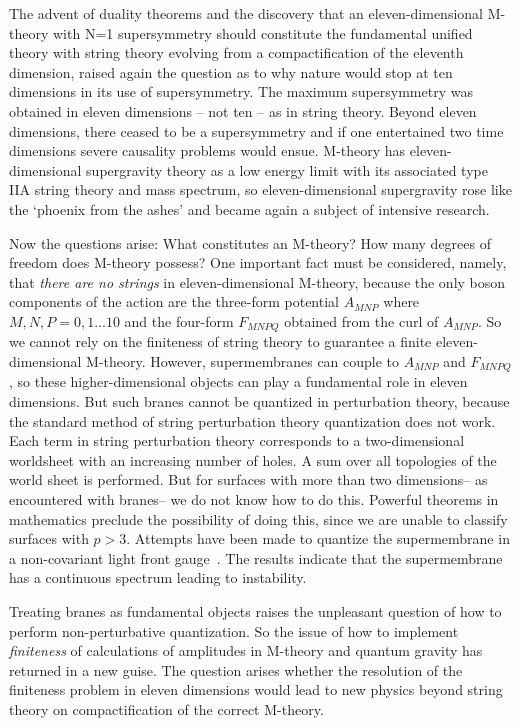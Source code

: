 \documentclass[a4paper,12pt]{article}
\begin{document}
The advent of
duality theorems and the discovery that an eleven-dimensional
M-theory with N=1 supersymmetry should constitute the fundamental
unified theory with string theory evolving from a
compactification of the eleventh dimension, raised again the
question as to why nature would stop at ten dimensions in its
use of supersymmetry. The maximum supersymmetry was obtained in
eleven dimensions -- not ten -- as in string theory. Beyond
eleven dimensions, there ceased to be a supersymmetry and if one
entertained two time dimensions severe causality problems
would ensue. M-theory has eleven-dimensional
supergravity theory as a low energy limit with its associated
type IIA string theory and mass spectrum, so eleven-dimensional
supergravity rose like the `phoenix from the ashes' and became
again a subject of intensive research.

Now the questions arise: What constitutes an M-theory? How many
degrees of freedom does M-theory possess? One important fact
must be considered, namely, that {\it there are no strings} in
eleven-dimensional M-theory, because the only boson components
of the action are the three-form potential $A_{MNP}$ where
$M,N,P=0,1...10$ and the four-form $F_{MNPQ}$ obtained from the
curl of $A_{MNP}$. So we cannot rely on the finiteness of string
theory to guarantee a finite eleven-dimensional M-theory.
However, supermembranes can couple to $A_{MNP}$ and $F_{MNPQ}$,
so these higher-dimensional objects can play a fundamental role
in eleven dimensions. But such branes cannot be quantized in
perturbation theory, because the standard method of string
perturbation theory quantization does not work. Each term in
string perturbation theory corresponds to a two-dimensional
worldsheet with an increasing number of holes. A sum over all
topologies of the world sheet is performed. But for surfaces
with more than two dimensions-- as encountered with branes-- we
do not know how to do this. Powerful theorems in mathematics
preclude the possibility of doing this, since we are unable to
classify surfaces with $p > 3$. Attempts have been made
to quantize the supermembrane in a non-covariant light
front gauge~\cite{Duff}. The results indicate that the
supermembrane has a continuous spectrum leading to instability.

Treating branes
as fundamental objects raises the unpleasant question of how to
perform non-perturbative quantization. So the issue of how to
implement {\it finiteness} of calculations of amplitudes in
M-theory and quantum gravity has returned in a new guise. The
question arises whether the resolution of the finiteness problem
in eleven dimensions would lead to new physics beyond string
theory on compactification of the correct M-theory.
\end{document}
